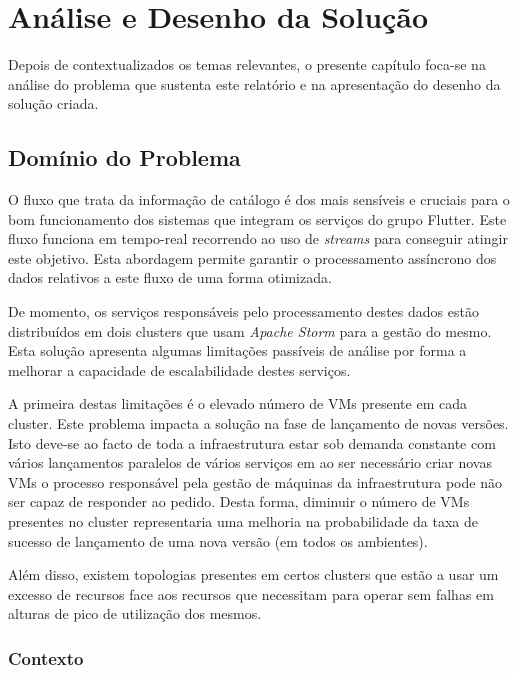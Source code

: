 \chapter{Análise e Desenho da Solução}
\label{sec:3-Analise}

Depois de contextualizados os temas relevantes, o presente capítulo foca-se na análise do problema 
que sustenta este relatório e na apresentação do desenho da solução criada.

\section{Domínio do Problema}

O fluxo que trata da informação de catálogo é dos mais sensíveis e cruciais para o bom funcionamento
dos sistemas que integram os serviços do grupo Flutter. Este fluxo funciona em tempo-real recorrendo
ao uso de \textit{streams} para conseguir atingir este objetivo. Esta abordagem permite garantir
o processamento assíncrono dos dados relativos a este fluxo de uma forma otimizada.

De momento, os serviços responsáveis pelo processamento destes dados estão distribuídos em dois
\glspl{cluster} que usam \textit{Apache Storm} para a gestão do mesmo. Esta solução apresenta algumas
limitações passíveis de análise por forma a melhorar a capacidade de escalabilidade destes serviços. 

A primeira destas limitações é o elevado número de \acp{VM} presente em cada \gls{cluster}. Este 
problema impacta a solução na fase de lançamento de novas versões. Isto deve-se ao facto de toda a 
infraestrutura estar sob demanda constante com vários lançamentos paralelos de vários serviços em 
ao ser necessário criar novas \acp{VM} o processo responsável pela gestão de máquinas da
infraestrutura pode não ser capaz de responder ao pedido. Desta forma, diminuir o número de \acp{VM}
presentes no \gls{cluster} representaria uma melhoria na probabilidade da taxa de sucesso de
lançamento de uma nova versão (em todos os ambientes).

Além disso, existem topologias presentes em certos \glspl{cluster} que estão a usar um excesso de
recursos face aos recursos que necessitam para operar sem falhas em alturas de pico de utilização
dos mesmos.

\subsection{Contexto}

